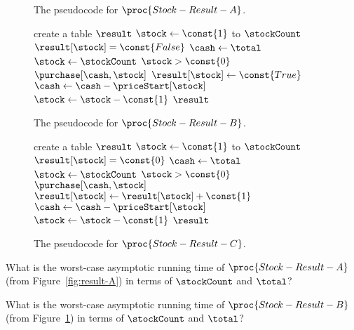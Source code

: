 \documentclass[12pt,twoside]{article}
\newcommand{\answerIIk}{\solution{
1
}}
\begin{document}
\begin{problems}
\begin{figure}[p]
\caption{The pseudocode for $\proc{Stock-Result-A}$.}
\label{fig:result-A}

\hfill

\begin{codebox}
\li create a table $\result$
\li \For $\stock \gets \const{1}$ to $\stockCount$ \Do
\li		$\result[\stock] = \const{False}$
	\End
\li
\li $\cash \gets \total$
\li $\stock \gets \stockCount$
\li \While $\stock > \const{0}$ \Do
\li		\If $\purchase[\cash, \stock]$ \Then
\li			$\result[\stock] \gets \const{True}$
\li			$\cash \gets \cash - \priceStart[\stock]$
		\End
\li		$\stock \gets \stock - \const{1}$
	\End
\li
\li	\Return $\result$
\end{codebox}
\caption{The pseudocode for $\proc{Stock-Result-B}$.}
\label{fig:result-B}
\end{figure}

\begin{figure}

\begin{codebox}
\li create a table $\result$
\li \For $\stock \gets \const{1}$ to $\stockCount$ \Do
\li		$\result[\stock] = \const{0}$
	\End
\li
\li $\cash \gets \total$
\li $\stock \gets \stockCount$
\li \While $\stock > \const{0}$ \Do
\li		\If $\purchase[\cash, \stock]$ \Then
\li			$\result[\stock] \gets \result[\stock] + \const{1}$
\li			$\cash \gets \cash - \priceStart[\stock]$
\li		\Else
\li			$\stock \gets \stock - \const{1}$
		\End
	\End
\li
\li	\Return $\result$
\end{codebox}

\caption{The pseudocode for $\proc{Stock-Result-C}$.}
\label{fig:result-C}

\end{figure}

\begin{problemparts}
\problempart
{}
What is the worst-case asymptotic running time of
$\proc{Stock-Result-A}$
(from Figure~\ref{fig:result-A})
in terms of $\stockCount$ and $\total$?
\runtimeAnswers

\answerIIk
\end{problemparts}

\begin{problemparts}
\problempart
{}
What is the worst-case asymptotic running time of
$\proc{Stock-Result-B}$
(from Figure~\ref{fig:result-B})
in terms of $\stockCount$ and $\total$?
\runtimeAnswers


\end{problemparts}
\end{problems}
\end{document}
